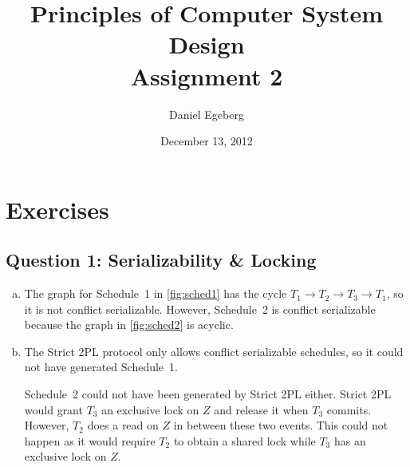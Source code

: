 \documentclass[a4paper]{article}
\title{Principles of Computer System Design \\ Assignment 2}
\author{Daniel Egeberg}
\date{December 13, 2012}
\begin{document}
\maketitle

\section{Exercises}

\subsection{Question 1: Serializability \& Locking}

\begin{enumerate}[(a)]
    \item The graph for Schedule~1 in \autoref{fig:sched1} has the cycle $T_1
        \to T_2 \to T_3 \to T_1$, so it is not conflict serializable. However,
        Schedule~2 is conflict serializable because the graph in
        \autoref{fig:sched2} is acyclic.

    \item The Strict 2PL protocol only allows conflict serializable schedules,
        so it could not have generated Schedule~1.

        Schedule~2 could not have been generated by Strict 2PL either. Strict
        2PL would grant $T_3$ an exclusive lock on $Z$ and release it when
        $T_3$ commits. However, $T_2$ does a read on $Z$ in between these two
        events. This could not happen as it would require $T_2$ to obtain a
        shared lock while $T_3$ has an exclusive lock on $Z$.

\end{enumerate}
\end{document}
